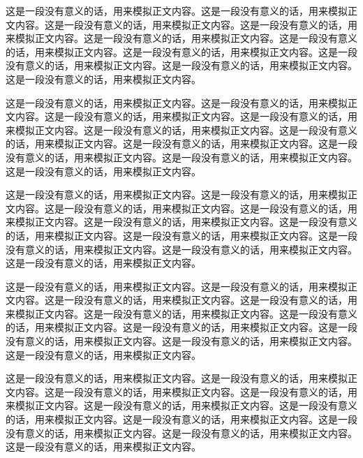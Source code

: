 
这是一段没有意义的话，用来模拟正文内容。这是一段没有意义的话，用来模拟正文内容。这是一段没有意义的话，用来模拟正文内容。这是一段没有意义的话，用来模拟正文内容。这是一段没有意义的话，用来模拟正文内容。这是一段没有意义的话，用来模拟正文内容。这是一段没有意义的话，用来模拟正文内容。这是一段没有意义的话，用来模拟正文内容。这是一段没有意义的话，用来模拟正文内容。这是一段没有意义的话，用来模拟正文内容。


这是一段没有意义的话，用来模拟正文内容。这是一段没有意义的话，用来模拟正文内容。这是一段没有意义的话，用来模拟正文内容。这是一段没有意义的话，用来模拟正文内容。这是一段没有意义的话，用来模拟正文内容。这是一段没有意义的话，用来模拟正文内容。这是一段没有意义的话，用来模拟正文内容。这是一段没有意义的话，用来模拟正文内容。这是一段没有意义的话，用来模拟正文内容。这是一段没有意义的话，用来模拟正文内容。


这是一段没有意义的话，用来模拟正文内容。这是一段没有意义的话，用来模拟正文内容。这是一段没有意义的话，用来模拟正文内容。这是一段没有意义的话，用来模拟正文内容。这是一段没有意义的话，用来模拟正文内容。这是一段没有意义的话，用来模拟正文内容。这是一段没有意义的话，用来模拟正文内容。这是一段没有意义的话，用来模拟正文内容。这是一段没有意义的话，用来模拟正文内容。这是一段没有意义的话，用来模拟正文内容。


这是一段没有意义的话，用来模拟正文内容。这是一段没有意义的话，用来模拟正文内容。这是一段没有意义的话，用来模拟正文内容。这是一段没有意义的话，用来模拟正文内容。这是一段没有意义的话，用来模拟正文内容。这是一段没有意义的话，用来模拟正文内容。这是一段没有意义的话，用来模拟正文内容。这是一段没有意义的话，用来模拟正文内容。这是一段没有意义的话，用来模拟正文内容。这是一段没有意义的话，用来模拟正文内容。


这是一段没有意义的话，用来模拟正文内容。这是一段没有意义的话，用来模拟正文内容。这是一段没有意义的话，用来模拟正文内容。这是一段没有意义的话，用来模拟正文内容。这是一段没有意义的话，用来模拟正文内容。这是一段没有意义的话，用来模拟正文内容。这是一段没有意义的话，用来模拟正文内容。这是一段没有意义的话，用来模拟正文内容。这是一段没有意义的话，用来模拟正文内容。这是一段没有意义的话，用来模拟正文内容。

